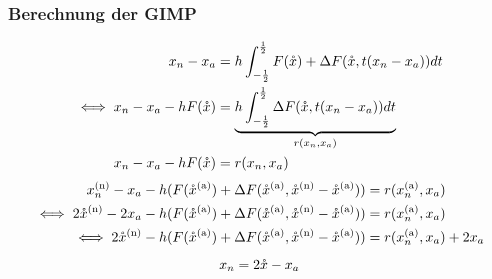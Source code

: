 \begin{frame}[<+->]
\frametitle{Berechnung der GIMP}
\begin{align}
x_n - x_a &= h \int_{-\frac{1}{2}}^{\frac{1}{2}} F(\mathring{x}) + \Delta F(\mathring{x},t(x_n-x_a))dt\\
\iff x_n - x_a -h F(\mathring{x})&= \underbrace{h \int_{-\frac{1}{2}}^{\frac{1}{2}} \Delta F(\mathring{x},t(x_n-x_a))dt}_{r(x_n,x_a)}\\
x_n - x_a -h F(\mathring{x}) &= r(x_n,x_a)
\end{align}
\begin{align}
  x_n^{\text{(n)}} - x_a - h (F(\mathring{x}^{\text{(a)}}) +\Delta F(\mathring{x}^{\text{(a)}},\mathring{x}^{\text{(n)}} - \mathring{x}^{\text{(a)}})) &= r(x_n^{\text{(a)}},x_a)\\
 \iff 2\mathring{x}^{\text{(n)}} - 2x_a - h (F(\mathring{x}^{\text{(a)}}) +\Delta F(\mathring{x}^{\text{(a)}},\mathring{x}^{\text{(n)}} - \mathring{x}^{\text{(a)}})) &= r(x_n^{\text{(a)}},x_a)\\
 \iff  2\mathring{x}^{\text{(n)}} -  h (F(\mathring{x}^{\text{(a)}}) +\Delta F(\mathring{x}^{\text{(a)}},\mathring{x}^{\text{(n)}} - \mathring{x}^{\text{(a)}})) &= r(x_n^{\text{(a)}},x_a) + 2x_a
\end{align}
\[x_n = 2\mathring{x} - x_a\]
\end{frame}


